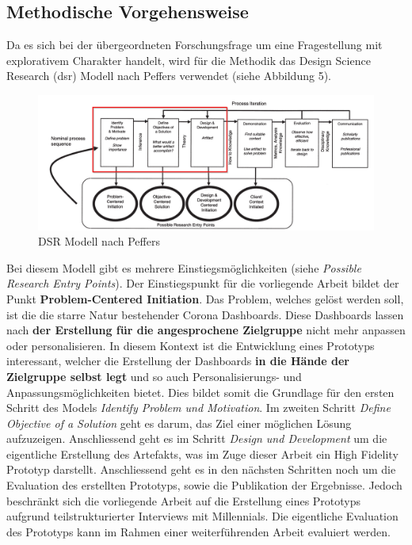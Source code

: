 \documentclass[12pt, oneside]{article}
\begin{document}
\subsection{Methodische Vorgehensweise}
Da es sich bei der übergeordneten Forschungsfrage um eine Fragestellung mit explorativem Charakter handelt, wird für die Methodik das Design Science Research (\Gls{dsr}) Modell nach Peffers verwendet (siehe Abbildung 5).


\begin{figure}[ht]
	\includegraphics[width=12cm]{images/peffers_dsr_model.png}
	\centering
	\caption{DSR Modell nach Peffers ~\citep{K.Peffers.2007}}
\end{figure}

Bei diesem Modell gibt es mehrere Einstiegsmöglichkeiten (siehe \textit{Possible Research Entry Points}). Der Einstiegspunkt für die vorliegende Arbeit bildet der Punkt \textbf{Problem-Centered Initiation}. Das Problem, welches gelöst werden soll, ist die die starre Natur bestehender Corona Dashboards. Diese Dashboards lassen nach \textbf{der Erstellung für die angesprochene Zielgruppe} nicht mehr anpassen oder personalisieren. In diesem Kontext ist die Entwicklung eines Prototyps interessant, welcher die Erstellung der Dashboards \textbf{in die Hände der Zielgruppe selbst legt} und so auch Personalisierungs- und Anpassungsmöglichkeiten bietet. Dies bildet somit die Grundlage für den ersten Schritt des Models \textit{Identify Problem und Motivation}. Im zweiten Schritt \textit{Define Objective of a Solution} geht es darum, das Ziel einer möglichen Lösung aufzuzeigen. Anschliessend geht es im Schritt \textit{Design und Development} um die eigentliche Erstellung des Artefakts, was im Zuge dieser Arbeit ein High Fidelity Prototyp darstellt. Anschliessend geht es in den nächsten Schritten noch um die Evaluation des erstellten Prototyps, sowie die Publikation der Ergebnisse. Jedoch beschränkt sich die vorliegende Arbeit auf die Erstellung eines Prototyps aufgrund teilstrukturierter Interviews mit Millennials. Die eigentliche Evaluation des Prototyps kann im Rahmen einer weiterführenden Arbeit evaluiert werden.
\end{document}
